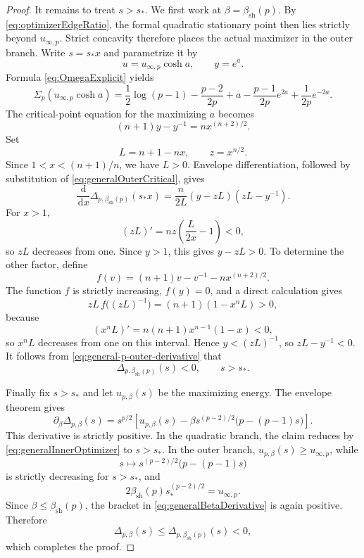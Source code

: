 \documentclass[10pt,a4paper]{amsart}
\newcommand{\dd}{\,\mathrm d}
\begin{document}
\begin{proof}
It remains to treat \(s>s_*\).  We first work at
\(\beta=\beta_{\mathrm{sh}}(p)\).  By
\eqref{eq:optimizerEdgeRatio}, the formal quadratic stationary point
then lies strictly beyond \(u_{\infty,p}\).  Strict concavity therefore
places the actual maximizer in the outer branch.  Write \(s=s_*x\) and
parametrize it by
\[
 u=u_{\infty,p}\cosh a,
 \qquad
 y=e^a.
\]
Formula \eqref{eq:OmegaExplicit} yields
\begin{equation}\label{eq:generalSigmaOutside}
 \Sigma_p(u_{\infty,p}\cosh a)
 =\frac12\log(p-1)-\frac{p-2}{2p}+a
  -\frac{p-1}{2p}e^{2a}+\frac1{2p}e^{-2a}.
\end{equation}
The critical-point equation for the maximizing \(a\) becomes
\begin{equation}\label{eq:generalOuterCritical}
 (n+1)y-y^{-1}=nx^{(n+2)/2}.
\end{equation}
Set
\[
 L=n+1-nx,
 \qquad
 z=x^{n/2}.
\]
Since \(1<x<(n+1)/n\), we have \(L>0\).  Envelope differentiation,
followed by substitution of \eqref{eq:generalOuterCritical}, gives
\begin{equation}\label{eq:general-p-outer-derivative}
 \frac{\dd}{\dd x}
 \Delta_{p,\beta_{\mathrm{sh}}(p)}(s_*x)
 =\frac{n}{2L}(y-zL)(zL-y^{-1}).
\end{equation}
For \(x>1\),
\[
 (zL)'=nz\left(\frac{L}{2x}-1\right)<0,
\]
so \(zL\) decreases from one.  Since \(y>1\), this gives
\(y-zL>0\).  To determine the other factor, define
\[
 f(v)=(n+1)v-v^{-1}-nx^{(n+2)/2}.
\]
The function \(f\) is strictly increasing, \(f(y)=0\), and a direct
calculation gives
\[
 zL\,f\bigl((zL)^{-1}\bigr)
 =(n+1)(1-x^nL)>0,
\]
because
\[
 (x^nL)'=n(n+1)x^{n-1}(1-x)<0,
\]
so \(x^nL\) decreases from one on this interval.  Hence
\(y<(zL)^{-1}\), so \(zL-y^{-1}<0\).  It follows from
\eqref{eq:general-p-outer-derivative} that
\[
 \Delta_{p,\beta_{\mathrm{sh}}(p)}(s)<0,
 \qquad s>s_*.
\]

Finally fix \(s>s_*\) and let \(u_{p,\beta}(s)\) be the maximizing
energy.  The envelope theorem gives
\begin{equation}\label{eq:generalBetaDerivative}
 \partial_\beta\Delta_{p,\beta}(s)
 =s^{p/2}\left[
  u_{p,\beta}(s)
  -\beta s^{(p-2)/2}\bigl(p-(p-1)s\bigr)
 \right].
\end{equation}
This derivative is strictly positive.  In the quadratic branch, the
claim reduces by \eqref{eq:generalInnerOptimizer} to \(s>s_*\).  In
the outer branch, \(u_{p,\beta}(s)\geq u_{\infty,p}\), while
\[
 s\longmapsto s^{(p-2)/2}\bigl(p-(p-1)s\bigr)
\]
is strictly decreasing for \(s>s_*\), and
\[
 2\beta_{\mathrm{sh}}(p)s_*^{(p-2)/2}=u_{\infty,p}.
\]
Since \(\beta\leq\beta_{\mathrm{sh}}(p)\), the bracket in
\eqref{eq:generalBetaDerivative} is again positive.  Therefore
\[
 \Delta_{p,\beta}(s)
 \leq\Delta_{p,\beta_{\mathrm{sh}}(p)}(s)<0,
\]
which completes the proof.
\end{proof}
\end{document}
